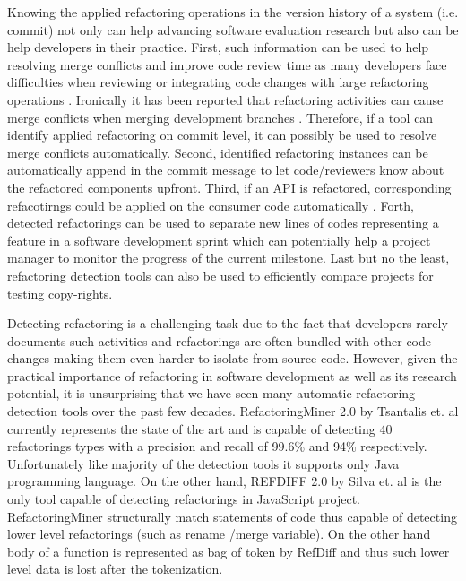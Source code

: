 \documentclass[letterpaper,12pt,onecolumn,final]{report}
\begin{document}
Knowing the applied refactoring operations in the version history of a system (i.e. commit) not only can help advancing software evaluation research but also can be help developers in their practice.  First, such information can be used to help resolving merge conflicts and improve code review time as many developers face difficulties when reviewing or integrating code changes with large refactoring operations \cite{kim2012field}. Ironically it has been reported that refactoring activities can cause merge conflicts when merging development branches \cite{mahmoudi2019refactorings}. Therefore, if a tool can identify applied refactoring on commit level, it can possibly be used to resolve merge conflicts automatically. Second, identified refactoring instances can be automatically append in the commit message to let code/reviewers know about the refactored components upfront. Third, if an API is refactored, corresponding refacotirngs could be applied on the consumer code automatically \cite{henkel2005catchup} \cite{Xing2008}. Forth, detected refactorings can be used to separate  new lines of codes representing a feature in a software development sprint which can potentially help a project manager to monitor the progress of the current milestone. Last but no the least, refactoring detection tools can also be used to efficiently compare projects for testing copy-rights.

Detecting refactoring is a challenging task due to the fact that developers rarely documents such activities \cite{alomar2021refactoring} and refactorings are often bundled with other code changes making them even harder to isolate from source code. However, given the practical importance of refactoring in software development as well as its research potential, it is unsurprising that we have seen many automatic refactoring detection tools over the past few decades. RefactoringMiner 2.0 by Tsantalis et. al \cite{Tsantalis2020} currently represents the state of the art and is capable of detecting 40 refactorings types with a precision and recall of 99.6\% and 94\% respectively.  Unfortunately like majority of the detection tools it supports only Java programming language. On the other hand, REFDIFF 2.0 by Silva et. al  \cite{Silva2020} is the only tool capable of detecting refactorings in JavaScript project. RefactoringMiner structurally match statements of code thus capable of detecting lower level refactorings (such as rename /merge variable). On the other hand body of a function is represented as bag of token by RefDiff and thus such lower level data is lost after the tokenization.
\end{document}
